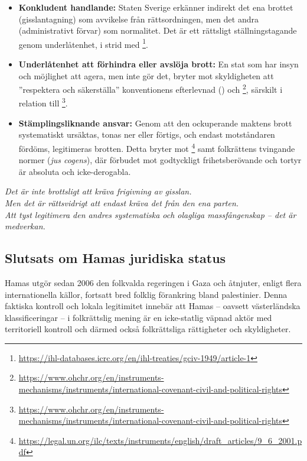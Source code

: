\begin{itemize}
  \item \textbf{Konkludent handlande:} Staten Sverige erkänner indirekt det ena brottet (gisslantagning) som avvikelse från rättsordningen, men det andra (administrativt förvar) som normalitet. Det är ett rättsligt ställningstagande genom underlåtenhet, i strid med \footnote{\url{https://ihl-databases.icrc.org/en/ihl-treaties/gciv-1949/article-1}}.

  \item \textbf{Underlåtenhet att förhindra eller avslöja brott:} En stat som har insyn och möjlighet att agera, men inte gör det, bryter mot skyldigheten att ”respektera och säkerställa” konventionens efterlevnad () och \footnote{\url{https://www.ohchr.org/en/instruments-mechanisms/instruments/international-covenant-civil-and-political-rights}}, särskilt i relation till \footnote{\url{https://www.ohchr.org/en/instruments-mechanisms/instruments/international-covenant-civil-and-political-rights}}.

  \item \textbf{Stämplingsliknande ansvar:} Genom att den ockuperande maktens brott systematiskt ursäktas, tonas ner eller förtigs, och endast motståndaren fördöms, legitimeras brotten. Detta bryter mot \footnote{\url{https://legal.un.org/ilc/texts/instruments/english/draft_articles/9_6_2001.pdf}} samt folkrättens tvingande normer (\textit{jus cogens}), där förbudet mot godtyckligt frihetsberövande och tortyr är absoluta och icke-derogabla.
\end{itemize}

\textit{Det är inte brottsligt att kräva frigivning av gisslan.}\\
\textit{Men det är rättsvidrigt att endast kräva det från den ena parten.}\\
\textit{Att tyst legitimera den andres systematiska och olagliga massfångenskap – det är medverkan.}


\subsection{Slutsats om Hamas juridiska status}

Hamas utgör sedan 2006 den folkvalda regeringen i Gaza och åtnjuter, enligt flera internationella
källor, fortsatt bred folklig förankring bland palestinier. Denna faktiska kontroll och lokala legitimitet
innebär att Hamas – oavsett västerländska klassificeringar – i folkrättslig mening är en icke-statlig väpnad
aktör med territoriell kontroll och därmed också folkrättsliga rättigheter och skyldigheter.

